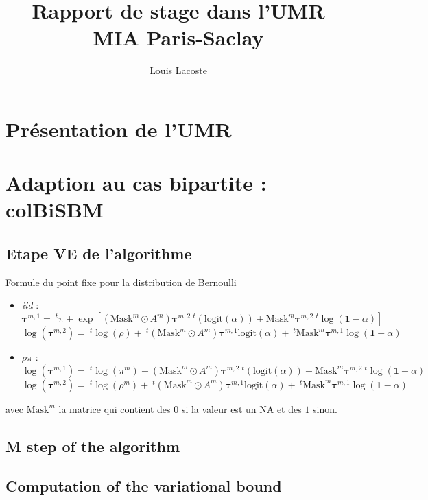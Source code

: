 \documentclass[12pt,a4paper]{rapport1}
\title{Rapport de stage dans l'UMR MIA Paris-Saclay}
\author{Louis Lacoste}
\begin{document}
\maketitle
\tableofcontents

\chapter{Présentation de l'UMR}

\chapter{Adaption au cas bipartite : colBiSBM}

\section{Etape VE de l'algorithme}
Formule du point fixe pour la distribution de Bernoulli
\begin{itemize}
    \item \textit{iid} :
    \[ \bm{\tau}^{m,1} = ~^{t}\pi + \exp[(\text{Mask}^{m} \odot A^{m})
        \bm{\tau}^{m,2} ~^{t}(\text{logit}(\alpha)) + \text{Mask}^{m} 
        \bm{\tau}^{m,2} ~^{t}\log(\bm{1} - \alpha)] \]
    \[ \log(\bm{\tau}^{m,2}) = ~^{t}\log(\rho) + ~^{t}(\text{Mask}^{m} \odot A^{m}) 
    \bm{\tau}^{m,1} \text{logit}(\alpha) + ~^{t}\text{Mask}^{m} 
        \bm{\tau}^{m,1} \log(\bm{1} - \alpha) \]
    \item $\rho\pi$ :
        \[ \log(\bm{\tau}^{m,1}) = ~^{t}\log(\pi^{m}) + (\text{Mask}^{m} \odot A^{m})
            \bm{\tau}^{m,2} ~^{t}(\text{logit}(\alpha)) + \text{Mask}^{m} 
            \bm{\tau}^{m,2} ~^{t}\log(\bm{1} - \alpha) \]
        \[ \log(\bm{\tau}^{m,2}) = ~^{t}\log(\rho^{m}) + ~^{t}(\text{Mask}^{m} \odot A^{m}) 
        \bm{\tau}^{m,1} \text{logit}(\alpha) + ~^{t}\text{Mask}^{m} 
            \bm{\tau}^{m,1} \log(\bm{1} - \alpha) \]
\end{itemize}

avec $\text{Mask}^{m}$ la matrice qui contient des $0$ si la valeur est un NA et
des $1$ sinon.

\section{M step of the algorithm}

\section{Computation of the variational bound}
\end{document}
